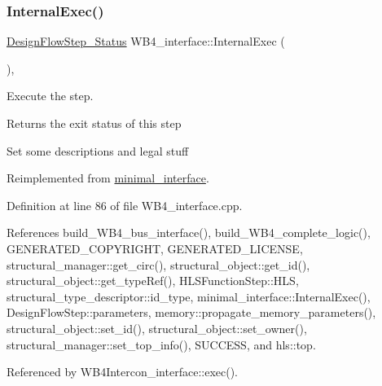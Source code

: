 \subsubsection{\texorpdfstring{Internal\+Exec()}{InternalExec()}}
{\footnotesize\ttfamily \hyperlink{design__flow__step_8hpp_afb1f0d73069c26076b8d31dbc8ebecdf}{Design\+Flow\+Step\+\_\+\+Status} W\+B4\+\_\+interface\+::\+Internal\+Exec (\begin{DoxyParamCaption}{ }\end{DoxyParamCaption})\hspace{0.3cm}{\ttfamily [override]}, {\ttfamily [virtual]}}



Execute the step. 

\begin{DoxyReturn}{Returns}
the exit status of this step 
\end{DoxyReturn}
Set some descriptions and legal stuff 

Reimplemented from \hyperlink{classminimal__interface_a38ab4c7e28f6f8c7dd9cd98989b8bddf}{minimal\+\_\+interface}.



Definition at line 86 of file W\+B4\+\_\+interface.\+cpp.



References build\+\_\+\+W\+B4\+\_\+bus\+\_\+interface(), build\+\_\+\+W\+B4\+\_\+complete\+\_\+logic(), G\+E\+N\+E\+R\+A\+T\+E\+D\+\_\+\+C\+O\+P\+Y\+R\+I\+G\+HT, G\+E\+N\+E\+R\+A\+T\+E\+D\+\_\+\+L\+I\+C\+E\+N\+SE, structural\+\_\+manager\+::get\+\_\+circ(), structural\+\_\+object\+::get\+\_\+id(), structural\+\_\+object\+::get\+\_\+type\+Ref(), H\+L\+S\+Function\+Step\+::\+H\+LS, structural\+\_\+type\+\_\+descriptor\+::id\+\_\+type, minimal\+\_\+interface\+::\+Internal\+Exec(), Design\+Flow\+Step\+::parameters, memory\+::propagate\+\_\+memory\+\_\+parameters(), structural\+\_\+object\+::set\+\_\+id(), structural\+\_\+object\+::set\+\_\+owner(), structural\+\_\+manager\+::set\+\_\+top\+\_\+info(), S\+U\+C\+C\+E\+SS, and hls\+::top.



Referenced by W\+B4\+Intercon\+\_\+interface\+::exec().

